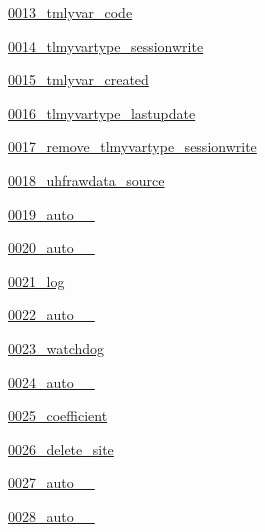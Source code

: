\begin{DoxyCompactItemize}
\item 
 \hyperlink{namespace_ground_segment_1_1migrations_1_10013__tmlyvar__code}{0013\+\_\+tmlyvar\+\_\+code}
\item 
 \hyperlink{namespace_ground_segment_1_1migrations_1_10014__tlmyvartype__sessionwrite}{0014\+\_\+tlmyvartype\+\_\+sessionwrite}
\item 
 \hyperlink{namespace_ground_segment_1_1migrations_1_10015__tmlyvar__created}{0015\+\_\+tmlyvar\+\_\+created}
\item 
 \hyperlink{namespace_ground_segment_1_1migrations_1_10016__tlmyvartype__lastupdate}{0016\+\_\+tlmyvartype\+\_\+lastupdate}
\item 
 \hyperlink{namespace_ground_segment_1_1migrations_1_10017__remove__tlmyvartype__sessionwrite}{0017\+\_\+remove\+\_\+tlmyvartype\+\_\+sessionwrite}
\item 
 \hyperlink{namespace_ground_segment_1_1migrations_1_10018__uhfrawdata__source}{0018\+\_\+uhfrawdata\+\_\+source}
\item 
 \hyperlink{namespace_ground_segment_1_1migrations_1_10019__auto__20161202__1004}{0019\+\_\+auto\+\_\+\_}
\item 
 \hyperlink{namespace_ground_segment_1_1migrations_1_10020__auto__20161202__1040}{0020\+\_\+auto\+\_\+\_}
\item 
 \hyperlink{namespace_ground_segment_1_1migrations_1_10021__log}{0021\+\_\+log}
\item 
 \hyperlink{namespace_ground_segment_1_1migrations_1_10022__auto__20161202__1258}{0022\+\_\+auto\+\_\+\_}
\item 
 \hyperlink{namespace_ground_segment_1_1migrations_1_10023__watchdog}{0023\+\_\+watchdog}
\item 
 \hyperlink{namespace_ground_segment_1_1migrations_1_10024__auto__20161204__1335}{0024\+\_\+auto\+\_\+\_}
\item 
 \hyperlink{namespace_ground_segment_1_1migrations_1_10025__coefficient}{0025\+\_\+coefficient}
\item 
 \hyperlink{namespace_ground_segment_1_1migrations_1_10026__delete__site}{0026\+\_\+delete\+\_\+site}
\item 
 \hyperlink{namespace_ground_segment_1_1migrations_1_10027__auto__20170115__1508}{0027\+\_\+auto\+\_\+\_}
\item 
 \hyperlink{namespace_ground_segment_1_1migrations_1_10028__auto__20170115__1524}{0028\+\_\+auto\+\_\+\_}
\item 

\end{DoxyCompactItemize}
